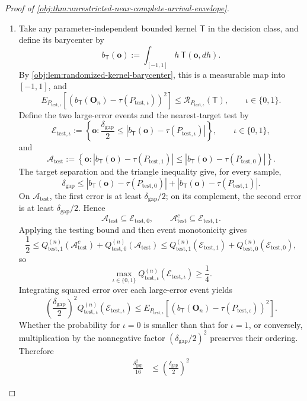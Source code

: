 \documentclass[11pt]{article}
\begin{document}
\begin{proof}[Proof of \cref{obj:thm:unrestricted-near-complete-arrival-envelope}]
\begin{enumerate}
\item Take any parameter-independent bounded kernel \(\mathsf T\) in the decision class, and define its barycenter by
\[
b_{\mathsf T}(\mathbf o)
:=
\int_{[-1,1]}h\,\mathsf T(\mathbf o,dh).
\]
By \cref{obj:lem:randomized-kernel-barycenter}, this is a measurable map into \([-1,1]\), and
\[
E_{P_{\mathrm{test},\iota}}\!\left[
\left(b_{\mathsf T}(\mathbf O_n)-\tau(P_{\mathrm{test},\iota})\right)^2
\right]
\le
\mathcal R_{P_{\mathrm{test},\iota}}(\mathsf T),
\qquad \iota\in\{0,1\}.
\]
Define the two large-error events and the nearest-target test by
\[
\mathcal E_{\mathrm{test},\iota}
:=
\left\{\mathbf o:
\frac{\delta_{\mathrm{gap}}}{2}
\le
\left|b_{\mathsf T}(\mathbf o)-\tau(P_{\mathrm{test},\iota})\right|
\right\},
\qquad \iota\in\{0,1\},
\]
and
\[
\mathcal A_{\mathrm{test}}
:=
\left\{\mathbf o:
\left|b_{\mathsf T}(\mathbf o)-\tau(P_{\mathrm{test},1})\right|
\le
\left|b_{\mathsf T}(\mathbf o)-\tau(P_{\mathrm{test},0})\right|
\right\}.
\]
The target separation and the triangle inequality give, for every sample,
\[
\delta_{\mathrm{gap}}
\le
\left|b_{\mathsf T}(\mathbf o)-\tau(P_{\mathrm{test},0})\right|
+
\left|b_{\mathsf T}(\mathbf o)-\tau(P_{\mathrm{test},1})\right|.
\]
On \(\mathcal A_{\mathrm{test}}\), the first error is at least
\(\delta_{\mathrm{gap}}/2\); on its complement, the second error is at least
\(\delta_{\mathrm{gap}}/2\). Hence
\[
\mathcal A_{\mathrm{test}}\subseteq\mathcal E_{\mathrm{test},0},
\qquad
\mathcal A_{\mathrm{test}}^c\subseteq\mathcal E_{\mathrm{test},1}.
\]
Applying the testing bound and then event monotonicity gives
\[
\frac12
\le
Q_{\mathrm{test},1}^{(n)}(\mathcal A_{\mathrm{test}}^c)
+
Q_{\mathrm{test},0}^{(n)}(\mathcal A_{\mathrm{test}})
\le
Q_{\mathrm{test},1}^{(n)}(\mathcal E_{\mathrm{test},1})
+
Q_{\mathrm{test},0}^{(n)}(\mathcal E_{\mathrm{test},0}),
\]
so
\[
\max_{\iota\in\{0,1\}}
Q_{\mathrm{test},\iota}^{(n)}(\mathcal E_{\mathrm{test},\iota})
\ge\frac14.
\]
Integrating squared error over each large-error event yields
\[
\left(\frac{\delta_{\mathrm{gap}}}{2}\right)^2
Q_{\mathrm{test},\iota}^{(n)}(\mathcal E_{\mathrm{test},\iota})
\le
E_{P_{\mathrm{test},\iota}}\!\left[
\left(b_{\mathsf T}(\mathbf O_n)-\tau(P_{\mathrm{test},\iota})\right)^2
\right].
\]
Whether the probability for \(\iota=0\) is smaller than that for \(\iota=1\), or conversely, multiplication by the nonnegative factor
\((\delta_{\mathrm{gap}}/2)^2\) preserves their ordering. Therefore
\[
\begin{aligned}
\frac{\delta_{\mathrm{gap}}^2}{16}
&\le
\left(\frac{\delta_{\mathrm{gap}}}{2}\right)^2

\end{aligned}\]
\end{enumerate}
\end{proof}
\end{document}
